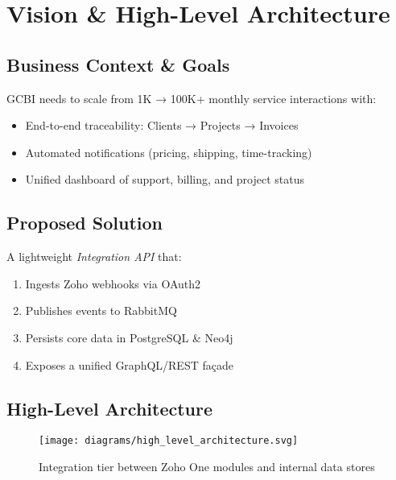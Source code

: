 \section{Vision \& High-Level Architecture}

\subsection{Business Context \& Goals}
GCBI needs to scale from 1K → 100K+ monthly service interactions with:
\begin{itemize}
  \item End-to-end traceability: Clients → Projects → Invoices
  \item Automated notifications (pricing, shipping, time-tracking)
  \item Unified dashboard of support, billing, and project status
\end{itemize}

\subsection{Proposed Solution}
A lightweight \emph{Integration API} that:
\begin{enumerate}
  \item Ingests Zoho webhooks via OAuth2
  \item Publishes events to RabbitMQ
  \item Persists core data in PostgreSQL \& Neo4j
  \item Exposes a unified GraphQL/REST façade
\end{enumerate}

\subsection{High-Level Architecture}
\begin{figure}[h]
  \centering
  \texttt{[image: diagrams/high\_level\_architecture.svg]}
  \caption{Integration tier between Zoho One modules and internal data stores}
\end{figure} 